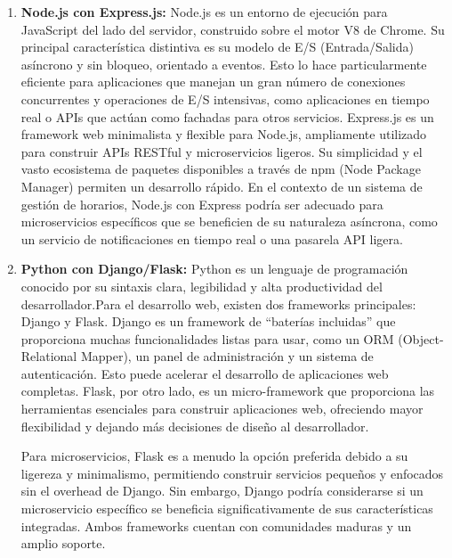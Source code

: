 \begin{enumerate}
    \item \textbf{Node.js con Express.js:}
    Node.js es un entorno de ejecución para JavaScript del lado del servidor, construido sobre el motor V8 de Chrome. Su principal característica distintiva es su modelo de E/S (Entrada/Salida) asíncrono y sin bloqueo, orientado a eventos. Esto lo hace particularmente eficiente para aplicaciones que manejan un gran número de conexiones concurrentes y operaciones de E/S intensivas, como aplicaciones en tiempo real o APIs que actúan como fachadas para otros servicios. Express.js es un framework web minimalista y flexible para Node.js, ampliamente utilizado para construir APIs RESTful y microservicios ligeros. Su simplicidad y el vasto ecosistema de paquetes disponibles a través de npm (Node Package Manager) permiten un desarrollo rápido. En el contexto de un sistema de gestión de horarios, Node.js con Express podría ser adecuado para microservicios específicos que se beneficien de su naturaleza asíncrona, como un servicio de notificaciones en tiempo real o una pasarela API ligera.

    \item \textbf{Python con Django/Flask:}
    Python es un lenguaje de programación conocido por su sintaxis clara, legibilidad y alta productividad del desarrollador.Para el desarrollo web, existen dos frameworks principales: Django y Flask. Django es un framework de ``baterías incluidas'' que proporciona muchas funcionalidades listas para usar, como un ORM (Object-Relational Mapper), un panel de administración y un sistema de autenticación. Esto puede acelerar el desarrollo de aplicaciones web completas. Flask, por otro lado, es un micro-framework que proporciona las herramientas esenciales para construir aplicaciones web, ofreciendo mayor flexibilidad y dejando más decisiones de diseño al desarrollador.

    Para microservicios, Flask es a menudo la opción preferida debido a su ligereza y minimalismo, permitiendo construir servicios pequeños y enfocados sin el overhead de Django. Sin embargo, Django podría considerarse si un microservicio específico se beneficia significativamente de sus características integradas. Ambos frameworks cuentan con comunidades maduras y un amplio soporte.


\end{enumerate}
